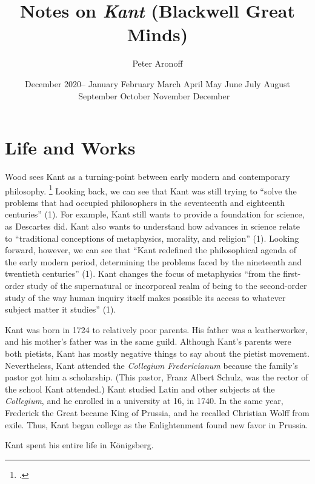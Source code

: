 \documentclass[12pt,letterpaper]{article}
\newcommand{\MONTH}{%
  \ifcase\the\month
  \or January%
  \or February%
  \or March%
  \or April%
  \or May%
  \or June%
  \or July%
  \or August%
  \or September%
  \or October%
  \or November%
  \or December%
  \fi}
\begin{document}
\begin{titlepage}
    \title{Notes on \textit{Kant} (Blackwell Great Minds)}
    \author{Peter Aronoff}
    \date{December 2020--\MONTH\ \the\year}
    \maketitle
    \thispagestyle{empty}
\end{titlepage}

\pagestyle{notes}

\section*{Life and Works}

Wood sees Kant as a turning-point between early modern and contemporary philosophy.%
\footcite[Unless stated otherwise, all references come from][]{kant-wood-2005}
Looking back, we can see that Kant was still trying to ``solve the problems that had occupied philosophers in the seventeenth and eighteenth centuries'' (1).
For example, Kant still wants to provide a foundation for science, as Descartes did.
Kant also wants to understand how advances in science relate to ``traditional conceptions of metaphysics, morality, and religion'' (1).
Looking forward, however, we can see that ``Kant redefined the philosophical agenda of the early modern period, determining the problems faced by the nineteenth and twentieth centuries'' (1).
Kant changes the focus of metaphysics ``from the first-order study of the supernatural or incorporeal realm of being to the second-order study of the way human inquiry itself makes possible its access to whatever subject matter it studies'' (1).

Kant was born in 1724 to relatively poor parents.
His father was a leatherworker, and his mother's father was in the same guild.
Although Kant's parents were both pietists, Kant has mostly negative things to say about the pietist movement.
Nevertheless, Kant attended the \textit{Collegium Fredericianum} because the family's pastor got him a scholarship.
(This pastor, Franz Albert Schulz, was the rector of the school Kant attended.)
Kant studied Latin and other subjects at the \textit{Collegium}, and he enrolled in a university at 16, in 1740.
In the same year, Frederick the Great became King of Prussia, and he recalled Christian Wolff from exile.
Thus, Kant began college as the Enlightenment found new favor in Prussia.

Kant spent his entire life in Königsberg.

\newpage
\pagestyle{references}

\printbibliography[filter=primary,title={Primary Sources}]
\printbibliography[filter=secondary,title={Secondary Sources}]
\end{document}
